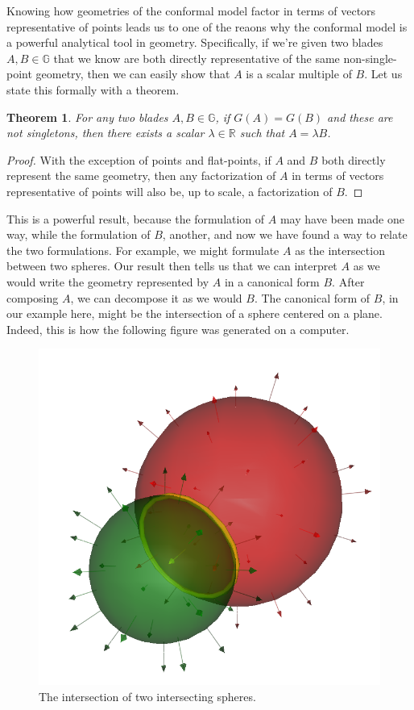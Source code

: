 \documentclass[12pt]{article}
\newcommand{\G}{\mathbb{G}}
\newcommand{\R}{\mathbb{R}}
\newtheorem{theorem}{Theorem}[section]
\begin{document}
Knowing how geometries of the conformal model factor in terms of vectors
representative of points leads us to one of the reaons why the conformal model
is a powerful analytical tool in geometry.  Specifically, if we're given two blades $A,B\in\G$ that
we know are both directly representative of the same non-single-point geometry, then we can easily show
that $A$ is a scalar multiple of $B$.  Let us state this formally with a theorem.
\begin{theorem}\label{thm_same_geos}
For any two blades $A,B\in\G$, if $G(A)=G(B)$ and these are not singletons,
then there exists a scalar $\lambda\in\R$ such that $A=\lambda B$.
\end{theorem}
\begin{proof}
With the exception of points and flat-points,
if $A$ and $B$ both directly represent the same geometry,
then any factorization of $A$ in terms of vectors representative of points will
also be, up to scale, a factorization of $B$.
\end{proof}
This is a powerful result, because the formulation
of $A$ may have been made one way, while the formulation of $B$, another, and now
we have found a way to relate the two formulations.  For example,
we might formulate $A$ as the intersection between two spheres.  Our result then tells us
that we can interpret $A$ as we would write the geometry represented by $A$ in a
canonical form $B$.  After composing $A$, we can decompose it as we would $B$.
The canonical form of $B$, in our example here, might be the intersection of a sphere centered on a plane.
Indeed, this is how the following figure was generated on a computer.
\begin{figure}[H]
\centering
\includegraphics[scale=0.3]{RealIntersectionOfTwoSpheresFigure}
\caption{The intersection of two intersecting spheres.}
\end{figure}
\end{document}

